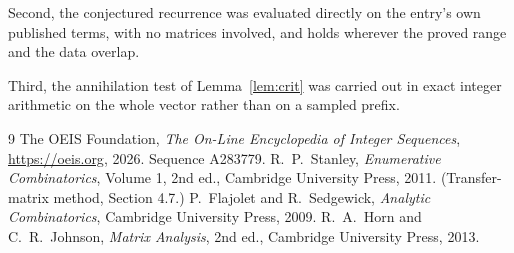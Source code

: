 \documentclass[11pt,a4paper]{article}
\theoremstyle{plain}
\theoremstyle{definition}
\begin{document}
Second, the conjectured recurrence was evaluated directly on the entry's own published terms,
with no matrices involved, and holds wherever the proved range and the data overlap.

Third, the annihilation test of Lemma~\ref{lem:crit} was carried out in exact integer
arithmetic on the whole vector rather than on a sampled prefix.

\begin{thebibliography}{9}
 The OEIS Foundation, \emph{The On-Line Encyclopedia of Integer
Sequences}, \url{https://oeis.org}, 2026. Sequence A283779.
 R.~P.~Stanley, \emph{Enumerative Combinatorics}, Volume 1, 2nd ed.,
Cambridge University Press, 2011. (Transfer-matrix method, Section 4.7.)
 P.~Flajolet and R.~Sedgewick, \emph{Analytic Combinatorics}, Cambridge
University Press, 2009.
 R.~A.~Horn and C.~R.~Johnson, \emph{Matrix Analysis}, 2nd ed., Cambridge
University Press, 2013.
\end{thebibliography}
\end{document}
